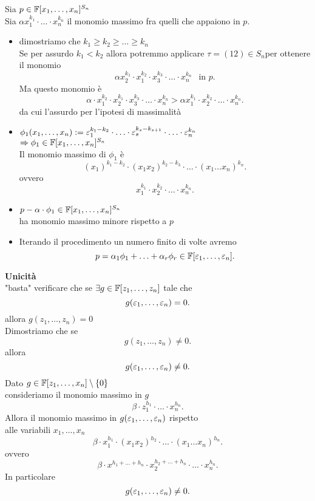 \documentclass[12px]{article}
\begin{document}
\begin{dimo}
	Sia $p\in \mathbb{F}[x_1,\ldots, x_n]^{S_n}$ \\
	Sia $\alpha x_1^{k_1}\cdot\ldots\cdot x_n^{k_n}$ il monomio massimo fra quelli che appaiono in $p$.
	 \begin{itemize}
		 \item dimostriamo che $k_1\geq k_2\geq \ldots\geq k_n$\\
			 Se per assurdo $k_1 < k_2$ allora potremmo applicare $\tau  = ( 12)\in S_n$per ottenere il monomio
			  \[
				  \alpha x_2^{k_1}\cdot x_1^{k_2}\cdot x_3^{k_3}\cdot\ldots\cdot x_n^{k_n} \ \ \text{ in } p
			 .\] 
			 Ma questo monomio è 
			 \[
				 \alpha\cdot x_1^{k_2}\cdot x_2^{k_1}\cdot x_3^{k_3}\cdot \ldots\cdot x_n^{k_n} > \alpha x_1^{k_1}\cdot x_2^{k_2}\cdot\ldots\cdot x_n^{k_n}
			 .\] 
			 da cui l'assurdo per l'ipotesi di massimalità
		 \item $\phi_1(x_1,\ldots,x_n): = \varepsilon_1^{k_1-k_2}\cdot\ldots\cdot\varepsilon_s^{k_s - k_{s+1}}\cdot\ldots\cdot \varepsilon^{k_n}_n$ \\
			 $ \Rightarrow \phi_1\in\mathbb{F}[x_1,\ldots, x_n]^{S_n}$ \\
			 Il monomio massimo di $\phi_1$ è 
			 \[
				 (x_1)^{k_1-k_2}\cdot (x_1x_2)^{k_2-k_3}\cdot\ldots\cdot(x_1\ldots x_n)^{k_n}
			 .\] 
			 ovvero
			 \[
				 x^{k_1}_1\cdot x_2^{k_2}\cdot\ldots\cdot x_n^{k_n}
			 .\] 
		 \item $p - \alpha\cdot \phi_1\in \mathbb{F}[x_1,\ldots,x_n]^{S_n}$\\
			 ha monomio massimo minore rispetto a $p$
		 \item Iterando il procedimento un numero finito di volte avremo
			  \[
				  p = \alpha_1\phi_1 + \ldots + \alpha_r\phi_r\in \mathbb{F}[\varepsilon_1,\ldots,\varepsilon_n]
			 .\] 
	\end{itemize}
	\textbf{Unicità}\\
	"basta" verificare che se $\exists g\in \mathbb{F}[z_1,\ldots, z_n]$ tale che
	\[
	g(\varepsilon_1,\ldots,\varepsilon_n) = 0
	.\] 
	allora $g(z_1,\ldots,z_n)= 0$\\
Dimostriamo che se 
\[
g(z_1,\ldots,z_n)\neq 0 
.\] 
allora
 \[
g(\varepsilon_1,\ldots, \varepsilon_n)\neq 0
.\] 
Dato $g\in \mathbb{F}[z_1,\ldots,x_n]\setminus\{0\}$\\
consideriamo il monomio massimo in $g$
 \[
	 \beta \cdot z_1^{h_1}\cdot\ldots\cdot x_n^{h_n}
.\] 
Allora il monomio massimo in $g(\varepsilon_1,\ldots,\varepsilon_n)$ rispetto\\
alle variabili $x_1,\ldots,x_n$\\
\[
	\beta\cdot x_1^{h_1}\cdot (x_1x_2)^{h_2}\cdot\ldots\cdot(x_1\ldots x_n)^{h_n}
.\] 
ovvero 
\[
	\beta \cdot x^{h_1 +\ldots +  h_n}\cdot x_2^{h_2 + \ldots + h_n}\cdot\ldots\cdot x_n^{h_n}
.\]  
In particolare
\[
g(\varepsilon_1,\ldots,\varepsilon_n) \neq 0
.\] 
\end{dimo}
\end{document}
